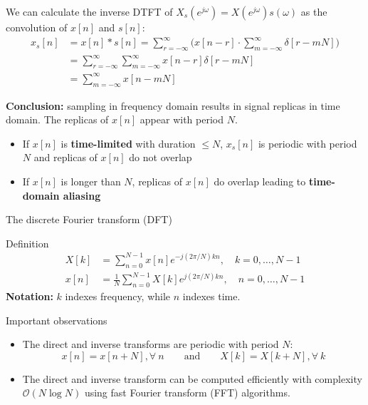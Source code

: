 \documentclass[10pt, handout]{beamer}
\begin{document}
%
\begin{frame}

We can calculate the inverse DTFT of $X_s(e^{j\omega}) = X(e^{j\omega})s(\omega)$ as the convolution of $x[n]$ and $s[n]$:
\begin{align*}
x_s[n] &= x[n]\ast s[n] = \sum_{r=-\infty}^{\infty} \bigg(x[n-r]\cdot \sum_{m=-\infty}^\infty\delta[r-mN]\bigg)\\
&= \sum_{r=-\infty}^{\infty} \sum_{m=-\infty}^\infty x[n-r]\delta[r-mN] \tag{only non-zero when $r = mN$} \\
&= \sum_{m=-\infty}^\infty x[n-mN]
\end{align*}

\textbf{Conclusion:} sampling in frequency domain results in signal replicas in time domain. The replicas of $x[n]$ appear with period $N$.

\begin{itemize}
	\item If $x[n]$ is \textbf{time-limited} with duration $\leq N$, $x_s[n]$ is periodic with period $N$ and replicas of $x[n]$ do not overlap
	\item If $x[n]$ is longer than $N$, replicas of $x[n]$ do overlap leading to \textbf{time-domain aliasing}
\end{itemize}

\end{frame}


\begin{frame}{The discrete Fourier transform (DFT)}
\begin{block}{Definition}
	\vspace{-0.6cm}
	\begin{align}
		X[k] &= \sum_{n = 0}^{N-1}x[n]e^{-j(2\pi/N)kn},\quad k = 0, \ldots, N-1 \tag{direct transform} \\
		x[n] &= \frac{1}{N}\sum_{n = 0}^{N-1}X[k]e^{j(2\pi/N)kn}, \quad n = 0, \ldots, N-1 \tag{inverse transform}
	\end{align}
	\noindent\textbf{Notation:} $k$ indexes frequency, while $n$ indexes time.
\end{block}

\begin{block}{Important observations}
\begin{itemize}
	\item The direct and inverse transforms are periodic with period $N$:
	\begin{equation*}
	x[n] = x[n+N], \forall~n \qquad\text{and}\qquad X[k] = X[k+N], \forall~k
	\end{equation*}
	\item The direct and inverse transform can be computed efficiently with complexity $\mathcal{O}({N\log N})$ using fast Fourier transform (FFT) algorithms.
\end{itemize}
\end{block}
\end{frame}
\end{document}
